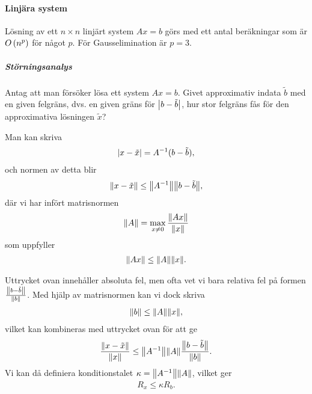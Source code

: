 \paragraph{Linjära system}
Lösning av ett $n\times n$ linjärt system $Ax = b$ görs med ett antal beräkningar som är $O\left(n^{p}\right)$ för något $p$. För Gausselimination är $p = 3$.

\subparagraph{Störningsanalys}
Antag att man försöker lösa ett system $Ax = b$. Givet approximativ indata $\tilde{b}$ med en given felgräns, dvs. en given gräns för $\abs{b - \tilde{b}}$, hur stor felgräns fås för den approximativa lösningen $\tilde{x}$?

Man kan skriva
\begin{align*}
	\abs{x - \tilde{x}} = A^{-1}(b - \tilde{b}),
\end{align*}
och normen av detta blir
\begin{align*}
	\norm{x - \tilde{x}} \leq \norm{A^{-1}}\norm{b - \tilde{b}},
\end{align*}
där vi har infört matrisnormen
\begin{align*}
	\norm{A} = \max\limits_{x \neq 0}\frac{\norm{Ax}}{\norm{x}}
\end{align*}
som uppfyller
\begin{align*}
	\norm{Ax} \leq \norm{A}\norm{x}.
\end{align*}

Uttrycket ovan innehåller absoluta fel, men ofta vet vi bara relativa fel på formen $\frac{\norm{b - \tilde{b}}}{\norm{b}}$. Med hjälp av matrisnormen kan vi dock skriva
\begin{align*}
	\norm{b} \leq \norm{A}\norm{x},
\end{align*}
vilket kan kombineras med uttrycket ovan för att ge
\begin{align*}
	\frac{\norm{x - \tilde{x}}}{\norm{x}} \leq \norm{A^{-1}}\norm{A}\frac{\norm{b - \tilde{b}}}{\norm{b}}.
\end{align*}
Vi kan då definiera konditionstalet $\kappa = \norm{A^{-1}}\norm{A}$, vilket ger
\begin{align*}
	R_{x} \leq \kappa R_{b}.
\end{align*}